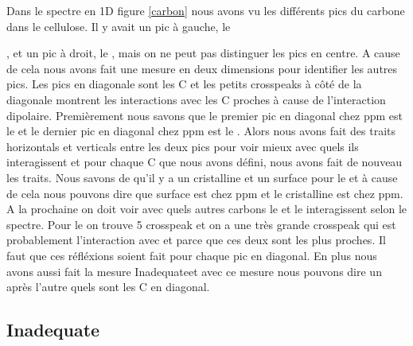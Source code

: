 \documentclass[a4paper,12pt]{scrartcl}
\begin{document}
Dans le spectre  en 1D figure \ref{carbon} nous avons vu les différents pics du carbone dans le cellulose. Il y avait un pic à gauche, le {, et un pic à droit, le {, mais on ne peut pas distinguer les pics en centre. A cause de cela nous avons fait une mesure en deux dimensions pour identifier les autres pics. Les pics en diagonale sont les C et les petits crosspeaks à côté de la diagonale montrent les interactions avec les C proches à cause de l’interaction dipolaire. Premièrement nous savons que le premier pic en diagonal chez \unit [105] {ppm} est le } et le dernier pic en diagonal chez \unit[62,5] {ppm} est le . Alors nous avons fait des traits horizontals et verticals entre les deux pics pour voir mieux avec quels ils interagissent et pour chaque C que nous avons défini, nous avons fait de nouveau les traits. Nous savons de \cite{dokument} qu’il y a un  cristalline et un  surface pour le  et à cause de cela nous pouvons dire que  surface est chez \unit [22,5] {ppm} et le  cristalline est chez \unit [65] {ppm}. A la prochaine on doit voir avec quels autres carbons le  et le  interagissent selon le spectre. Pour le  on trouve 5 crosspeak et on a une très grande crosspeak qui est probablement l’interaction avec  et  parce que ces deux sont les plus proches. Il faut que ces réfléxions soient fait pour chaque pic en diagonal. En plus nous avons aussi fait la mesure \flqq Inadequate\frqq et avec ce mesure nous pouvons dire un après l'autre quels sont les C en diagonal.  
  
  \subsection{Inadequate}

}
\end{document}
